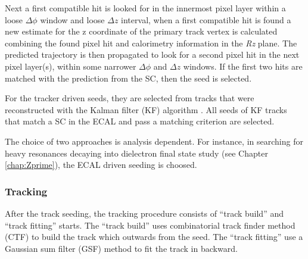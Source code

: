 Next a first compatible hit is looked for in the innermost pixel layer within a loose $\Delta\phi$ window and loose $\Delta z$ interval, when a first compatible hit is found a new estimate for the z coordinate of the primary track vertex is calculated combining the found pixel hit and calorimetry information in the \textit{Rz} plane. The predicted trajectory is then propagated to look for a second pixel hit in the next pixel layer(s), within some narrower $\Delta\phi$ and $\Delta z$ windows. If the first two hits are matched with the prediction from the SC, then the seed is selected.

For the tracker driven seeds, they are selected from tracks that were reconstructed with the Kalman filter (KF) algorithm \cite{Hamilton:2016qnl}.
All seeds of KF tracks that match a SC in the ECAL and pass a matching criterion are selected.

The choice of two approaches is analysis dependent. For instance, in searching for heavy resonances decaying into dielectron final state study (see Chapter \ref{chap:Zprime}), the ECAL driven seeding is choosed.


\subsubsection*{Tracking}\label{subsec:tracking}
After the track seeding, the tracking procedure consists of ``track build'' and ``track fitting'' starts. The ``track build'' uses combinatorial track finder method (CTF) \cite{track_jinst} to build the track which outwards from the seed. The ``track fitting'' use a Gaussian sum filter (GSF) method \cite{Anuar:2015lxt} to fit the track in backward.

